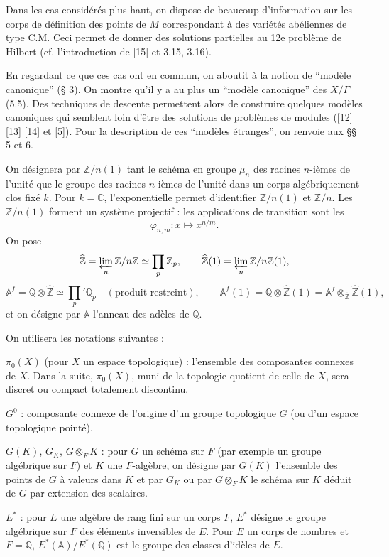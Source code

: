 \documentclass[10pt]{article}
\newcommand{\A}{\mathbb A}
\newcommand{\Af}{\mathbb A^f}
\newcommand{\C}{\mathbb C}
\newcommand{\Q}{\mathbb Q}
\newcommand{\Z}{\mathbb Z}
\newcommand{\limproj}{\varprojlim}
\newcommand{\whZ}{\widehat{\Z}}
\newcommand{\pii}{\pi_0}
\begin{document}
Dans les cas considérés plus haut, on dispose de beaucoup d'information sur les corps de définition des points de $M$ correspondant à des variétés abéliennes de type C.M. Ceci permet de donner des solutions partielles au 12e problème de Hilbert (cf. l'introduction de [15] et 3.15, 3.16).

En regardant ce que ces cas ont en commun, on aboutit à la notion de ``modèle canonique'' (§ 3). On montre qu'il y a au plus un ``modèle canonique'' des $X/\Gamma$ (5.5). Des techniques de descente permettent alors de construire quelques modèles canoniques qui semblent loin d'être des solutions de problèmes de modules ([12] [13] [14] et [5]). Pour la description de ces ``modèles étranges'', on renvoie aux §§ 5 et 6.

On désignera par $\Z/n(1)$ tant le schéma en groupe $\mu_n$ des racines $n$-ièmes de l'unité que le groupe des racines $n$-ièmes de l'unité dans un corps algébriquement clos fixé $\bar{k}$. Pour $\bar{k}=\C$, l'exponentielle permet d'identifier $\Z/n(1)$ et $\Z/n$. Les $\Z/n(1)$ forment un système projectif : les applications de transition sont les
\[
\varphi_{n,m}:x\longmapsto x^{n/m}.
\]
On pose
\[
\whZ=\limproj_n \Z/n\Z \simeq \prod_p \Z_p,\qquad
\whZ(1)=\limproj_n \Z/n\Z(1),
\]
\[
\Af=\Q\otimes\whZ\simeq \prod_p{}'\Q_p\quad(\text{produit restreint}),\qquad
\Af(1)=\Q\otimes\whZ(1)=\Af\otimes_{\whZ}\whZ(1),
\]
et on désigne par $\A$ l'anneau des adèles de $\Q$.

On utilisera les notations suivantes :

\noindent $\pii(X)$ (pour $X$ un espace topologique) : l'ensemble des composantes connexes de $X$. Dans la suite, $\pii(X)$, muni de la topologie quotient de celle de $X$, sera discret ou compact totalement discontinu.

\noindent $G^0$ : composante connexe de l'origine d'un groupe topologique $G$ (ou d'un espace topologique pointé).

\noindent $G(K)$, $G_K$, $G\otimes_FK$ : pour $G$ un schéma sur $F$ (par exemple un groupe algébrique sur $F$) et $K$ une $F$-algèbre, on désigne par $G(K)$ l'ensemble des points de $G$ à valeurs dans $K$ et par $G_K$ ou par $G\otimes_FK$ le schéma sur $K$ déduit de $G$ par extension des scalaires.

\noindent $E^*$ : pour $E$ une algèbre de rang fini sur un corps $F$, $E^*$ désigne le groupe algébrique sur $F$ des éléments inversibles de $E$. Pour $E$ un corps de nombres et $F=\Q$, $E^*(\A)/E^*(\Q)$ est le groupe des classes d'idèles de $E$.
\end{document}
